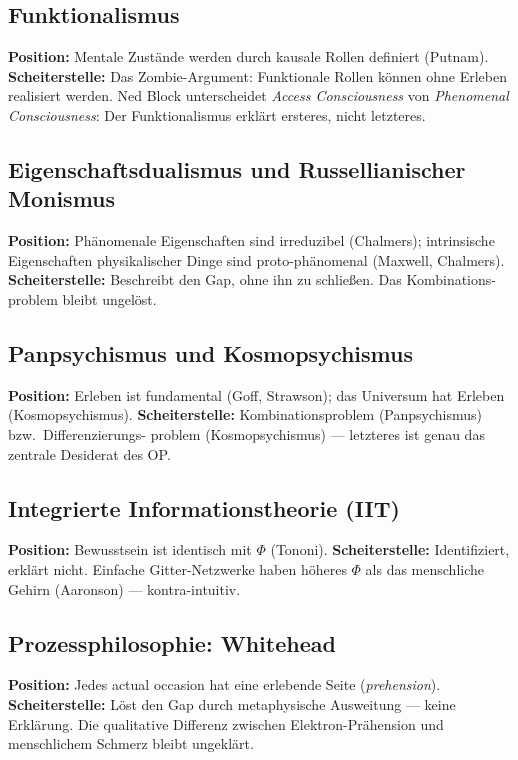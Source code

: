 \documentclass[11pt,a4paper]{article}
\theoremstyle{plain}
\theoremstyle{definition}
\begin{document}
\subsection{Funktionalismus}
\textbf{Position:} Mentale Zust\"{a}nde werden durch kausale Rollen definiert (Putnam).
\textbf{Scheiterstelle:} Das Zombie-Argument: Funktionale Rollen k\"{o}nnen ohne Erleben
realisiert werden. Ned Block unterscheidet \emph{Access Consciousness} von
\emph{Phenomenal Consciousness}: Der Funktionalismus erkl\"{a}rt ersteres, nicht letzteres.

\subsection{Eigenschaftsdualismus und Russellianischer Monismus}
\textbf{Position:} Ph\"{a}nomenale Eigenschaften sind irreduzibel (Chalmers); intrinsische
Eigenschaften physikalischer Dinge sind proto-ph\"{a}nomenal (Maxwell, Chalmers).
\textbf{Scheiterstelle:} Beschreibt den Gap, ohne ihn zu schlie\ss{}en. Das Kombinations-
problem bleibt ungelöst.

\subsection{Panpsychismus und Kosmopsychismus}
\textbf{Position:} Erleben ist fundamental (Goff, Strawson); das Universum hat Erleben
(Kosmopsychismus).
\textbf{Scheiterstelle:} Kombinationsproblem (Panpsychismus) bzw.\ Differenzierungs-
problem (Kosmopsychismus) --- letzteres ist genau das zentrale Desiderat des OP.

\subsection{Integrierte Informationstheorie (IIT)}
\textbf{Position:} Bewusstsein ist identisch mit $\Phi$ (Tononi).
\textbf{Scheiterstelle:} Identifiziert, erkl\"{a}rt nicht. Einfache Gitter-Netzwerke
haben h\"{o}heres $\Phi$ als das menschliche Gehirn (Aaronson) --- kontra-intuitiv.

\subsection{Prozessphilosophie: Whitehead}
\textbf{Position:} Jedes \glqq{}actual occasion\grqq{} hat eine erlebende Seite
(\emph{prehension}).
\textbf{Scheiterstelle:} L\"{o}st den Gap durch metaphysische Ausweitung --- keine
Erkl\"{a}rung. Die qualitative Differenz zwischen Elektron-Pr\"{a}hension und
menschlichem Schmerz bleibt ungekl\"{a}rt.
\end{document}
